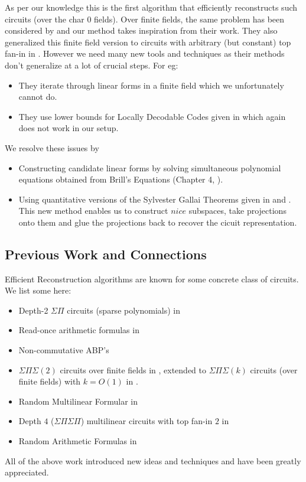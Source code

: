\documentclass[letterpaper,USenglish,numberwithinsect]{lipics}
\begin{document}
As per our knowledge this is the first algorithm that efficiently
reconstructs such circuits (over the char $0$ fields). Over finite fields, the same problem has been considered by \cite{Shpilka07} and
our method takes inspiration from their work. They also generalized this finite field version to circuits with arbitrary (but constant)
top fan-in in \cite{KarShp09}. However we need many new tools and techniques as their methods don't generalize at
a lot of crucial steps. For eg:
\begin{itemize}
\item They iterate through linear forms in a finite field which
we unfortunately cannot do.
\item They use lower bounds for Locally Decodable Codes given in \cite{DS07} which again
does not work in our setup.
\end{itemize}
We resolve these issues by
\begin{itemize}
 \item Constructing candidate linear forms by solving simultaneous polynomial equations obtained from Brill's Equations (Chapter 4, \cite{GKZ94}).
 \item Using quantitative versions of the Sylvester
Gallai Theorems given in \cite{BDWY11} and \cite{DSW12}. This new method enables us to construct $nice$
subspaces, take projections onto them and glue the projections back to recover the cicuit representation.
\end{itemize}



\subsection{Previous Work and Connections}

Efficient Reconstruction algorithms are known for some concrete class of circuits. We
list some here:
\begin{itemize}
 \item Depth-2 $\Sigma\Pi$ circuits (sparse polynomials) in \cite{KS01}
 \item Read-once arithmetic formulas in \cite{SV09}
 \item Non-commutative ABP's \cite{ArMS08}
 \item $\Sigma\Pi\Sigma(2)$ circuits over finite fields in \cite{Shpilka07}, extended to
 $\Sigma\Pi\Sigma(k)$ circuits (over finite fields) with $k=O(1)$ in \cite{KarShp09}.
\item Random Multilinear Formular in \cite{GuptaKL11}
\item Depth $4$ ($\Sigma\Pi\Sigma\Pi$) multilinear circuits with top fan-in $2$ in \cite{GuptaKL12}
\item Random Arithmetic Formulas in \cite{GKY14}
\end{itemize}
All of the above work introduced new ideas and techniques and have been greatly
appreciated.  \\
\end{document}
